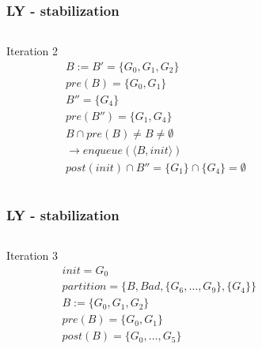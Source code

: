 \documentclass[11pt,handout]{beamer}
\begin{document}
\begin{frame}[fragile]
  \frametitle{LY - stabilization}
  \begin{columns}
    \begin{column}{0.5\textwidth}
      Iteration 2
      \begin{align*}
        & B := B' = \{G_0,G_1,G_2\} \\
        & pre(B) = \{G_0,G_1\} \\
        & B'' = \{G_4\} \\
        & pre(B'') = \{G_1,G_4\} \\
        & B \cap pre(B) \neq B \neq \emptyset \\
        & \to enqueue(\langle {B,init} \rangle) \\
        & post(init) \cap B'' = \{G_1\} \cap \{G_4\} = \emptyset
      \end{align*}
    \end{column}
    \begin{column}{0.5\textwidth}%
      
    \end{column}
  \end{columns}
\end{frame}

\begin{frame}[fragile]
  \frametitle{LY - stabilization}
  \begin{columns}
    \begin{column}{0.5\textwidth}
      Iteration 3
      \begin{align*}
        & init = G_0 \\
        & partition = \{B,Bad,\{G_6,\dots,G_9\},\{G_4\}\} \\
        & B := \{G_0,G_1,G_2\} \\
        & pre(B) = \{G_0,G_1\} \\
        & post(B) = \{G_0,\dots,G_5\}
      \end{align*}
    \end{column}
    \begin{column}{0.5\textwidth}%
      
    \end{column}
  \end{columns}
\end{frame}
\end{document}
